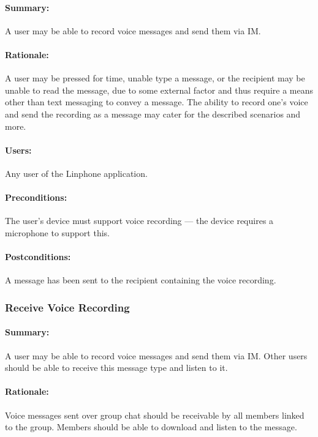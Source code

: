 \documentclass[11pt]{article}
\begin{document}
\paragraph{Summary:} A user may be able to record voice messages and send them via IM.
\paragraph{Rationale:} A user may be pressed for time, unable type a message, or the recipient may be unable to read the message, due to some external factor and thus require a means other than text messaging to convey a message. The ability to record one's voice and send the recording as a message may cater for the described scenarios and more.
\paragraph{Users:} Any user of the Linphone application.
\paragraph{Preconditions:} The user's device must support voice recording --- the device requires a microphone to support this.
\paragraph{{Postconditions:}} A message has been sent to the recipient containing the voice recording.

\subsubsection{Receive Voice Recording} \label{UC-receive-voice}
\paragraph{Summary:} A user may be able to record voice messages and send them via IM. Other users should be able to receive this message type and listen to it.
\paragraph{Rationale:} Voice messages sent over group chat should be receivable by all members linked to the group. Members should be able to download and listen to the message.
\end{document}
